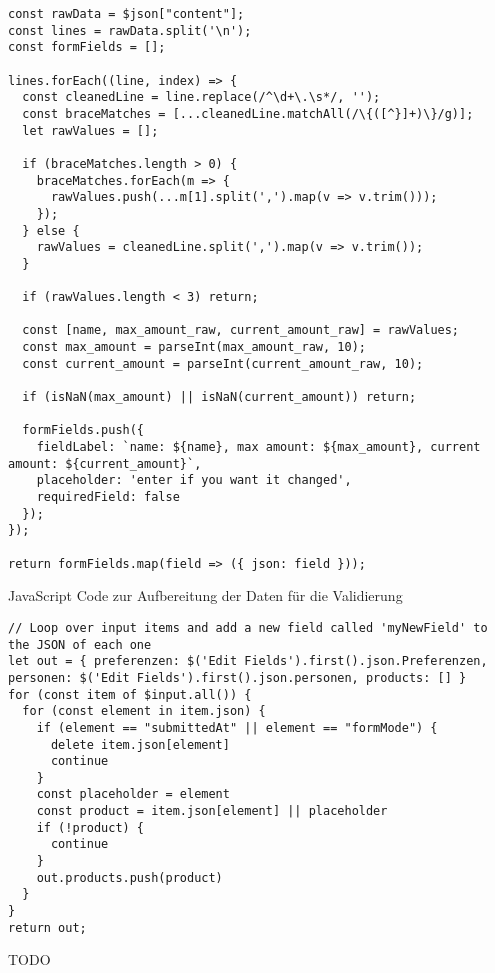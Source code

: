 \begin{listing}
\begin{verbatim}
const rawData = $json["content"];
const lines = rawData.split('\n');
const formFields = [];

lines.forEach((line, index) => {
  const cleanedLine = line.replace(/^\d+\.\s*/, '');
  const braceMatches = [...cleanedLine.matchAll(/\{([^}]+)\}/g)];
  let rawValues = [];

  if (braceMatches.length > 0) {
    braceMatches.forEach(m => {
      rawValues.push(...m[1].split(',').map(v => v.trim()));
    });
  } else {
    rawValues = cleanedLine.split(',').map(v => v.trim());
  }

  if (rawValues.length < 3) return;

  const [name, max_amount_raw, current_amount_raw] = rawValues;
  const max_amount = parseInt(max_amount_raw, 10);
  const current_amount = parseInt(current_amount_raw, 10);

  if (isNaN(max_amount) || isNaN(current_amount)) return;

  formFields.push({
    fieldLabel: `name: ${name}, max amount: ${max_amount}, current amount: ${current_amount}`,
    placeholder: 'enter if you want it changed',
    requiredField: false
  });
});

return formFields.map(field => ({ json: field }));
\end{verbatim}
\caption{JavaScript Code zur Aufbereitung der Daten für die Validierung}
\label{lst:descr:js:code1}
\end{listing}

\begin{listing}
\begin{verbatim}
// Loop over input items and add a new field called 'myNewField' to the JSON of each one
let out = { preferenzen: $('Edit Fields').first().json.Preferenzen, personen: $('Edit Fields').first().json.personen, products: [] }
for (const item of $input.all()) {
  for (const element in item.json) {
    if (element == "submittedAt" || element == "formMode") {
      delete item.json[element]
      continue
    }
    const placeholder = element
    const product = item.json[element] || placeholder
    if (!product) {
      continue
    }
    out.products.push(product)
  }
}
return out;
\end{verbatim}
\caption{TODO}
\label{lst:descr:js:code2}
\end{listing}

